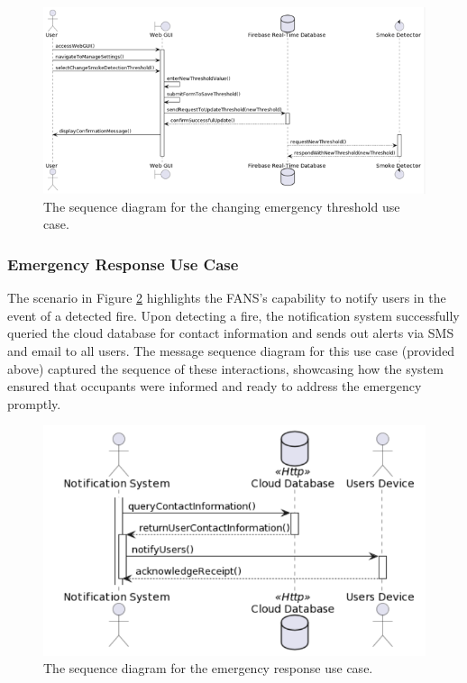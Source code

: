 \begin{figure}
    \centering
    \includegraphics[width=\imagewidth]{../assets/sequence/ChangingSmokeDetectionThresholdSequenceDiagram.png}
    \caption{The sequence diagram for the changing emergency threshold use case.}
    \label{fig:change-thresh}
\end{figure}

\subsubsection{Emergency Response Use Case}

The scenario in Figure \ref{fig:emergency-resp} highlights the FANS’s capability to notify users in the event of a
detected fire. Upon detecting a fire, the notification system successfully queried the cloud database for contact
information and sends out alerts via SMS and email to all users. The message sequence diagram for this use case
(provided above) captured the sequence of these interactions, showcasing how the system ensured that occupants were
informed and ready to address the emergency promptly.

\begin{figure}
    \centering
    \includegraphics[width=\imagewidth]{../assets/sequence/EmergencyResponseUseCase.png}
    \caption{The sequence diagram for the emergency response use case.}
    \label{fig:emergency-resp}
\end{figure}
